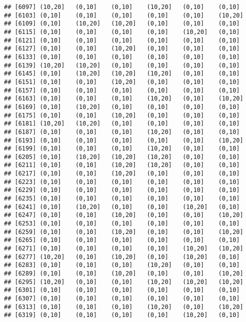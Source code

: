 \documentclass[]{article}
\begin{document}
\begin{verbatim}
## [6097] (10,20]   (0,10]    (0,10]    (10,20]   (0,10]    (0,10]   
## [6103] (0,10]    (0,10]    (0,10]    (0,10]    (0,10]    (10,20]  
## [6109] (0,10]    (10,20]   (10,20]   (0,10]    (0,10]    (0,10]   
## [6115] (0,10]    (0,10]    (0,10]    (0,10]    (10,20]   (0,10]   
## [6121] (0,10]    (0,10]    (0,10]    (0,10]    (0,10]    (0,10]   
## [6127] (0,10]    (0,10]    (10,20]   (0,10]    (0,10]    (0,10]   
## [6133] (0,10]    (0,10]    (0,10]    (0,10]    (0,10]    (0,10]   
## [6139] (10,20]   (10,20]   (0,10]    (0,10]    (0,10]    (0,10]   
## [6145] (0,10]    (10,20]   (10,20]   (10,20]   (0,10]    (0,10]   
## [6151] (0,10]    (0,10]    (10,20]   (0,10]    (0,10]    (0,10]   
## [6157] (0,10]    (0,10]    (0,10]    (0,10]    (0,10]    (0,10]   
## [6163] (0,10]    (0,10]    (0,10]    (10,20]   (0,10]    (10,20]  
## [6169] (0,10]    (10,20]   (0,10]    (0,10]    (0,10]    (0,10]   
## [6175] (0,10]    (0,10]    (10,20]   (0,10]    (0,10]    (0,10]   
## [6181] (10,20]   (10,20]   (0,10]    (0,10]    (0,10]    (0,10]   
## [6187] (0,10]    (0,10]    (0,10]    (10,20]   (0,10]    (0,10]   
## [6193] (0,10]    (0,10]    (0,10]    (0,10]    (0,10]    (10,20]  
## [6199] (0,10]    (0,10]    (0,10]    (10,20]   (0,10]    (0,10]   
## [6205] (0,10]    (10,20]   (10,20]   (10,20]   (0,10]    (0,10]   
## [6211] (0,10]    (0,10]    (10,20]   (10,20]   (0,10]    (0,10]   
## [6217] (0,10]    (0,10]    (10,20]   (0,10]    (0,10]    (0,10]   
## [6223] (0,10]    (0,10]    (0,10]    (0,10]    (0,10]    (0,10]   
## [6229] (0,10]    (0,10]    (0,10]    (0,10]    (0,10]    (0,10]   
## [6235] (0,10]    (0,10]    (0,10]    (0,10]    (0,10]    (0,10]   
## [6241] (0,10]    (10,20]   (0,10]    (0,10]    (10,20]   (0,10]   
## [6247] (0,10]    (0,10]    (10,20]   (0,10]    (0,10]    (10,20]  
## [6253] (0,10]    (0,10]    (0,10]    (0,10]    (0,10]    (0,10]   
## [6259] (0,10]    (0,10]    (10,20]   (0,10]    (0,10]    (10,20]  
## [6265] (0,10]    (0,10]    (0,10]    (0,10]    (0,10]    (0,10]   
## [6271] (0,10]    (0,10]    (0,10]    (0,10]    (10,20]   (10,20]  
## [6277] (10,20]   (0,10]    (10,20]   (0,10]    (10,20]   (0,10]   
## [6283] (0,10]    (0,10]    (0,10]    (10,20]   (0,10]    (0,10]   
## [6289] (0,10]    (0,10]    (10,20]   (0,10]    (0,10]    (10,20]  
## [6295] (10,20]   (0,10]    (0,10]    (10,20]   (10,20]   (10,20]  
## [6301] (0,10]    (0,10]    (0,10]    (0,10]    (0,10]    (0,10]   
## [6307] (0,10]    (0,10]    (0,10]    (0,10]    (0,10]    (0,10]   
## [6313] (0,10]    (0,10]    (0,10]    (10,20]   (0,10]    (10,20]  
## [6319] (0,10]    (0,10]    (0,10]    (0,10]    (10,20]   (0,10]   

\end{verbatim}
\end{document}
